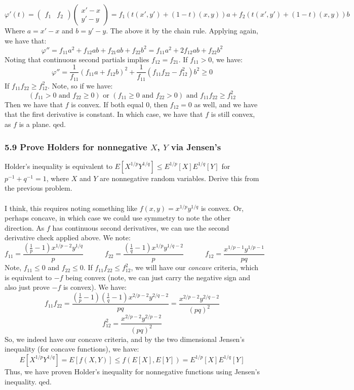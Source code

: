 \documentclass[12pt,a4paper]{article}
\newcommand{\1}[1]{\mathbbm{1}\left\{ #1 \right\}}
\begin{document}
\begin{enumerate}
	$$
		\varphi'(t) = 
		\begin{pmatrix}
		f_1 & f_2
		\end{pmatrix}
		\begin{pmatrix}
		x' - x\\
		y' - y
		\end{pmatrix}
		=
		f_1(t(x',y') + (1-t)(x,y)) a + f_2(t(x',y') + (1-t)(x,y)) b
	$$
	Where $a = x' - x$ and $b = y' - y$. The above it by the chain rule. Applying again, we have that:
	$$
		\varphi'' = f_{11}a^2 + f_{12}ab + f_{21}ab + f_{22}b^2 = f_{11}a^2 + 2f_{12}ab + f_{22}b^2
	$$
	Noting that continuous second partials implies $f_{12} = f_{21}$. If $f_{11} > 0$, we have:
	$$
		\varphi'' = \frac{1}{f_{11}}\left(f_{11}a + f_{12}b\right)^2 + 
		\frac{1}{f_{11}}\left(f_{11}f_{22} - f_{12}^2\right)b^2 \geq 0
	$$
	If $f_{11}f_{22} \geq f_{12}^2$. Note, so if we have:
	$$
		(f_{11} > 0 \text{ and } f_{22} \geq 0) \text{ or } (f_{11} \geq 0 \text{ and } f_{22} > 0) \text{ and }
		f_{11}f_{22} \geq f_{12}^2
	$$
	Then we have that $f$ is convex. If both equal $0$, then $f_{12} = 0$ as well, and we have that the first derivative is constant. In which case, we have that $f$ is still convex, as $f$ is a plane. qed.
	
\end{enumerate}

\subsubsection{5.9 Prove Holders for nonnegative $X$, $Y$ via Jensen's} Holder's inequality is equivalent to $E[X^{1/p}Y^{1/q}] \leq E^{1/p}[X]E^{1/q}[Y]$ for $p^{-1} + q^{-1} = 1$, where $X$ and $Y$ are nonnegative random variables. Derive this from the previous problem.
\\\\
I think, this requires noting something like $f(x,y) = x^{1/p}y^{1/q}$ is convex. Or, perhaps concave, in which case we could use symmetry to note the other direction. As $f$ has continuous second derivatives, we can use the second derivative check applied above. We note:
$$
	f_{11} = \frac{\left(\frac{1}{p} - 1\right)x^{1/p-2}y^{1/q}}{p} \quad\quad\quad
	f_{22} = \frac{\left(\frac{1}{q} - 1\right)x^{1/p}y^{1/q-2}}{p} \quad\quad\quad
	f_{12} = \frac{x^{1/p-1}y^{1/p-1}}{pq}
$$
Note, $f_{11} \leq 0$ and $f_{22} \leq 0$. If $f_{11}f_{22} \leq f_{12}^2$, we will have our \textit{concave} criteria, which is equivalent to $-f$ being convex (note, we can just carry the negative sign and also just prove $-f$ is convex). We have:
$$
	f_{11}f_{22} = \frac{\left(\frac{1}{p} - 1\right)\left(\frac{1}{q} - 1\right)x^{2/p-2}y^{2/q-2}}{pq} =
	\frac{x^{2/p-2}y^{2/q-2}}{(pq)^2}
$$
$$
	f_{12}^2 = \frac{x^{2/p-2}y^{2/p-2}}{(pq)^2}
$$
So, we indeed have our concave criteria, and by the two dimensional Jensen's inequality (for concave functions), we have:
$$
	E[X^{1/p}Y^{1/q}] = E[f(X,Y)] \leq f(E[X],E[Y]) = E^{1/p}[X]E^{1/q}[Y]
$$
Thus, we have proven Holder's inequality for nonnegative functions using Jensen's inequality. qed.
\end{document}
